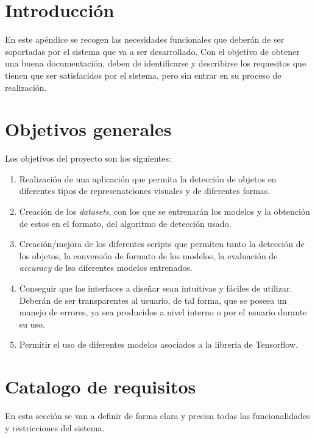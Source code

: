 
\section{Introducción}
En este apéndice se recogen las necesidades funcionales que deberán de ser soportadas por el sistema que va a ser desarrollado. Con el objetivo de obtener una buena documentación, deben de identificarse y describirse los requesitos que tienen que ser satisfacidos por el sistema, pero sin entrar en su proceso de realización.

\section{Objetivos generales}
Los objetivos del proyecto son los siguientes:
\begin{enumerate}
    \item Realización de una aplicación que permita la detección de objetos en diferentes tipos de represenatciones visuales y de diferentes formas.
    \item Creación de los \textit{datasets}, con los que se entrenarán los modelos y la obtención de estos en el formato, del algoritmo de detección usado.
    \item Creación/mejora de los diferentes scripts que permiten tanto la detección de los objetos, la conversión de formato de los modelos, la evaluación de \textit{accuracy} de lso diferentes modelos entrenados. 
    \item Conseguir que las interfaces a diseñar sean intuitivas y fáciles de utilizar. Deberán de ser transparentes al usuario, de tal forma, que se poseea un manejo de errores, ya sea producidos a nivel interno o por el usuario durante su uso.
    \item Permitir el uso de diferentes modelos asociados a la librería de Tensorflow.   
\end{enumerate}

\section{Catalogo de requisitos}
En esta sección se van a definir de forma clara y precisa todas las funcionalidades y restricciones del sistema.

